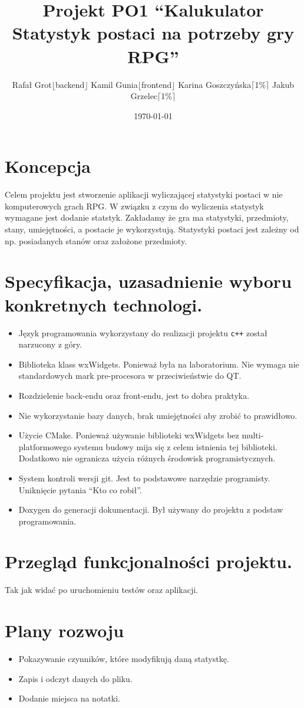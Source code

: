 \documentclass[11pt]{article}
\author{Rafał Grot\(\lfloor\)backend\(\rfloor\) Kamil Gunia\(\lfloor\)frontend\(\rfloor\) Karina Goszczyńska\(\lceil\)1\%\(\rceil\) Jakub Grzelec\(\lceil\)1\%\(\rceil\)}
\date{\today}
\title{Projekt PO1 ``Kalukulator Statystyk postaci na potrzeby gry RPG''}
\begin{document}
\maketitle
\tableofcontents

\newpage

\section{Koncepcja}
\label{sec:org0d929d7}
Celem projektu jest stworzenie aplikacji wyliczającej statystyki postaci w nie komputerowych grach RPG.
W związku z czym do wyliczenia statystyk wymagane jest dodanie statstyk.
Zakładamy że gra ma statystyki, przedmioty, stany, umiejętności, a postacie je wykorzystują.
Statystyki postaci jest zależny od np. posiadanych stanów oraz założone przedmioty.
\section{Specyfikacja, uzasadnienie wyboru konkretnych technologi.}
\label{sec:org3b72e96}
\begin{itemize}
\item Język programowania wykorzystany do realizacji projektu \texttt{c++} został narzucony z góry.
\item Biblioteka klass wxWidgets. Ponieważ była na laboratorium. Nie wymaga nie standardowych mark pre-procesora w przeciwieństwie do QT.
\item Rozdzielenie back-endu oraz front-endu, jest to dobra praktyka.
\item Nie wykorzystanie bazy danych, brak umiejętności aby zrobić to prawidłowo.
\item Użycie CMake. Ponieważ używanie biblioteki wxWidgets bez multi-platformowego systemu budowy mija się z celem istnienia tej biblioteki. Dodatkowo nie ogranicza użycia różnych środowisk programistycznych.
\item System kontroli wersji git. Jest to podstawowe narzędzie programisty. Uniknięcie pytania ``Kto co robił''.
\item Doxygen do generacji dokumentacji. Był używany do projektu z podstaw programowania.
\end{itemize}
\section{Przegląd funkcjonalności projektu.}
\label{sec:org31cca4d}
Tak jak widać po uruchomieniu testów oraz aplikacji.
\section{Plany rozwoju}
\label{sec:org2ff64c4}
\begin{itemize}
\item Pokazywanie czynników, które modyfikują daną statystkę.
\item Zapis i odczyt danych do pliku.
\item Dodanie miejsca na notatki.
\end{itemize}
\end{document}
